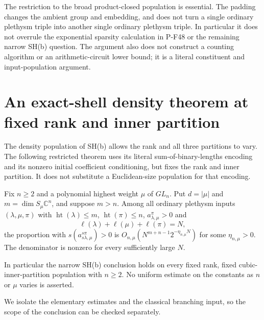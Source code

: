 The restriction to the broad product-closed population is
essential.  The padding changes the ambient group and embedding,
and does not turn a single ordinary plethysm triple into another
single ordinary plethysm triple.  In particular it does not
overrule the exponential sparsity calculation in P-F48 or the
remaining narrow SH(b) question.  The argument also does not
construct a counting algorithm or an arithmetic-circuit lower
bound; it is a literal constituent and input-population argument.



\section{An exact-shell density theorem at fixed rank and inner partition}
\label{sec:fixed-rank-density}

The density population of SH(b) allows the rank and all three
partitions to vary.  The following restricted theorem uses its
literal sum-of-binary-lengths encoding and its nonzero initial
coefficient conditioning, but fixes the rank and inner partition.
It does not substitute a Euclidean-size population for that encoding.

\begin{theorem}
Fix $n\ge2$ and a polynomial highest weight $\mu$ of $GL_n$.
Put $d=|\mu|$ and $m=\dim S_\mu\mathbb C^n$, and suppose
$m>n$.  Among all ordinary plethysm inputs $(\lambda,\mu,\pi)$
with $\operatorname{ht}(\lambda)\le m$, $\operatorname{ht}(\pi)\le n$,
$a_{\lambda,\mu}^{\pi}>0$ and
\[
              \ell(\lambda)+\ell(\mu)+\ell(\pi)=N,
\]
the proportion with $s(a_{s\lambda,\mu}^{s\pi})>0$ is
$O_{n,\mu}(N^{m+n-1}2^{-\eta_{n,\mu}N})$ for some
$\eta_{n,\mu}>0$.  The denominator is nonzero for every
sufficiently large $N$.

In particular the narrow SH(b) conclusion holds on every fixed
rank, fixed cubic-inner-partition population with $n\ge2$.
No uniform estimate on the constants as $n$ or $\mu$ varies is
asserted.
\end{theorem}

We isolate the elementary estimates and the classical branching
input, so the scope of the conclusion can be checked separately.

